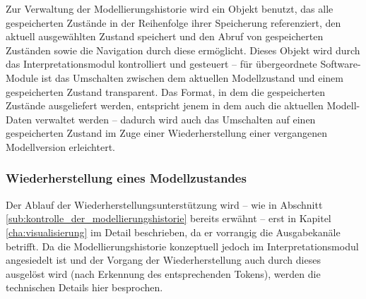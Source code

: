 Zur Verwaltung der Modellierungshistorie wird ein Objekt benutzt, das alle gespeicherten Zustände in der Reihenfolge ihrer Speicherung referenziert, den aktuell ausgewählten Zustand speichert und den Abruf von  gespeicherten Zuständen sowie die Navigation durch diese ermöglicht. Dieses Objekt wird durch das Interpretationsmodul kontrolliert und gesteuert -- für übergeordnete Software-Module ist das Umschalten zwischen dem aktuellen Modellzustand und einem gespeicherten Zustand transparent. Das Format, in dem die gespeicherten Zustände ausgeliefert werden, entspricht jenem in dem auch die aktuellen Modell-Daten verwaltet werden -- dadurch wird auch das Umschalten auf einen gespeicherten Zustand im Zuge einer Wiederherstellung einer vergangenen Modellversion erleichtert.

\subsubsection{Wiederherstellung eines Modellzustandes} %
\label{ssub:wiederherstellung_eines_modellzustandes}

Der Ablauf der Wiederherstellungsunterstützung wird -- wie in Abschnitt \ref{sub:kontrolle_der_modellierungshistorie} bereits erwähnt -- erst in Kapitel \ref{cha:visualisierung} im Detail beschrieben, da er vorrangig die Ausgabekanäle betrifft. Da die Modellierungshistorie konzeptuell jedoch im Interpretationsmodul angesiedelt ist und der Vorgang der Wiederherstellung auch durch dieses ausgelöst wird (nach Erkennung des entsprechenden Tokens), werden die technischen Details hier besprochen. 

